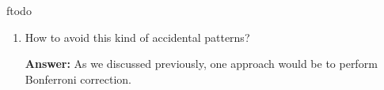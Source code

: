 ƒtodo\documentclass{article}
\newenvironment{QandA}{\begin{enumerate}[label=\arabic*.]}{\end{enumerate}}
\newenvironment{InnerQandA}{\begin{enumerate}[label=\roman*.]}{\end{enumerate}}
\newenvironment{answer}{\par\normalfont \textbf{Answer:}}{}
\begin{document}
\begin{QandA}
\begin{InnerQandA}
\begin{answer}
\begin{align*}
                &= 1 - \prod_{i=1}^m \Pr(\text{no error in test } i) & \text{(iid assumption)}\\
                &= 1 - \prod_{i=1}^m (1 - 1.37 \cdot 10^{-6}) \\
                &= 1 - (0.99999863)^{m} \\
                &= 1 - (0.99999863)^{99990000} \\
                &\approx 1
            \end{align*}
            Therefore, we see that in fact the probability of observing a correlation of $0.8$ or higher, when in fact there is no correlation between the stocks, is close to $1$. 
        \end{answer}

        \item How to avoid this kind of accidental patterns?
        \begin{answer}
            As we discussed previously, one approach would be to perform Bonferroni correction. 
        \end{answer}
    \end{InnerQandA}


\end{QandA}
\end{document}

